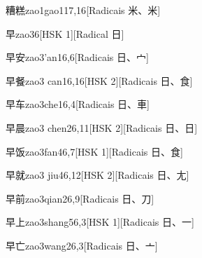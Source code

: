 \begin{entry}{糟糕}{zao1gao1}{17,16}[Radicais ⽶、⽶]
\end{entry}

\begin{entry}{早}{zao3}{6}[HSK 1][Radical ⽇]
\end{entry}

\begin{entry}{早安}{zao3'an1}{6,6}[Radicais ⽇、⼧]
\end{entry}

\begin{entry}{早餐}{zao3 can1}{6,16}[HSK 2][Radicais ⽇、⾷]
\end{entry}

\begin{entry}{早车}{zao3che1}{6,4}[Radicais ⽇、⾞]
\end{entry}

\begin{entry}{早晨}{zao3 chen2}{6,11}[HSK 2][Radicais ⽇、⽇]
\end{entry}

\begin{entry}{早饭}{zao3fan4}{6,7}[HSK 1][Radicais ⽇、⾷]
\end{entry}

\begin{entry}{早就}{zao3 jiu4}{6,12}[HSK 2][Radicais ⽇、⼪]
\end{entry}

\begin{entry}{早前}{zao3qian2}{6,9}[Radicais ⽇、⼑]
\end{entry}

\begin{entry}{早上}{zao3shang5}{6,3}[HSK 1][Radicais ⽇、⼀]
\end{entry}

\begin{entry}{早亡}{zao3wang2}{6,3}[Radicais ⽇、⼇]
\end{entry}

